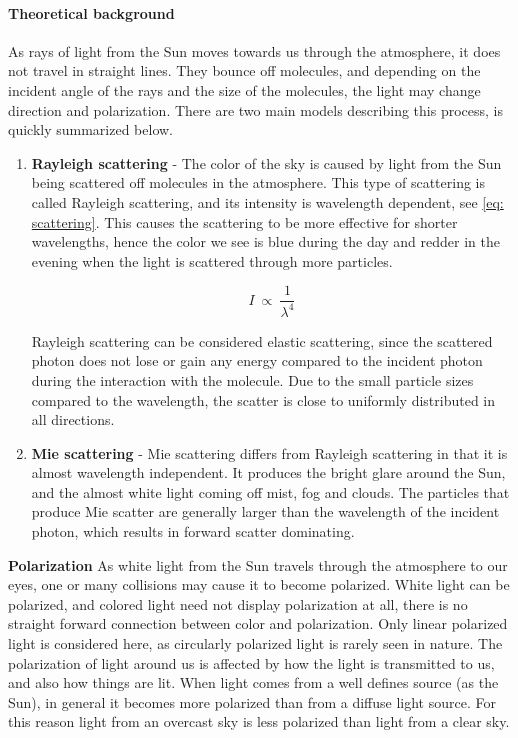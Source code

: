 \documentclass[]{book}
\begin{document}
		\paragraph{Theoretical background}
		As rays of light from the Sun moves towards us through the atmosphere, it does not travel in straight lines. They bounce off molecules, and depending on the incident angle of the rays and the size of the molecules, the light may change direction and polarization. There are two main models describing this process, is quickly summarized below.
		\begin{enumerate}
			\item \textbf{Rayleigh scattering} - The color of the sky is caused by light from the Sun being scattered off molecules in the atmosphere. This type of scattering is called Rayleigh scattering, and its intensity is wavelength dependent, see \ref{eq: scattering}. This causes the scattering to be more effective for shorter wavelengths, hence the color we see is blue during the day and redder in the evening when the light is scattered through more particles. 
			
			\begin{equation} \label{eq: scattering}
			I\ \propto \ \frac{1}{\lambda^{4}}
			\end{equation}
			
			Rayleigh scattering can be considered elastic scattering, since the scattered photon does not lose or gain any energy compared to the incident photon during the interaction with the molecule. Due to the small particle sizes compared to the wavelength, the scatter is close to uniformly distributed in all directions.
			\item \textbf{Mie scattering} - Mie scattering differs from Rayleigh scattering in that it is almost wavelength independent. It produces the bright glare around the Sun, and the almost white light coming off mist, fog and clouds. The particles that produce Mie scatter are generally larger than the wavelength of the incident photon, which results in forward scatter dominating.
		\end{enumerate}
		
		\textbf{Polarization}
		As white light from the Sun travels through the atmosphere to our eyes, one or many collisions may cause it to become polarized. White light can be polarized, and colored light need not display polarization at all, there is no straight forward connection between color and polarization. Only linear polarized light is considered here, as circularly polarized light is rarely seen in nature. The polarization of light around us is affected by how the light is transmitted to us, and also how things are lit. When light comes from a well defines source (as the Sun), in general it becomes more polarized than from a diffuse light source. For this reason light from an overcast sky is less polarized than light from a clear sky.
		
\end{document}
